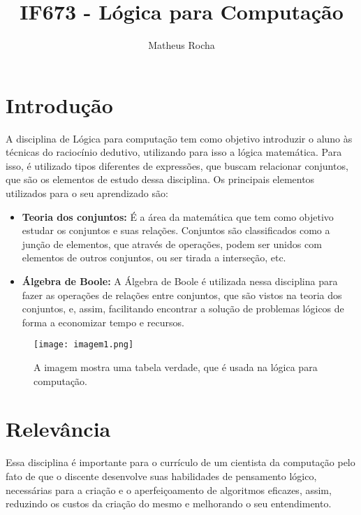 \documentclass[10pt]{article}
\title{IF673 - Lógica para Computação}
\author{Matheus Rocha}
\date{\vspace{-5ex}}
\begin{document}
\maketitle

\section{Introdução}
A disciplina de Lógica para computação tem como objetivo introduzir o aluno às técnicas do raciocínio dedutivo, utilizando para isso a lógica matemática. Para isso, é utilizado tipos diferentes de expressões, que buscam relacionar conjuntos, que são os elementos de estudo dessa disciplina. Os principais elementos utilizados para o seu aprendizado são: 
\begin{itemize}
    \item \textbf{Teoria dos conjuntos:} É a área da matemática que tem como objetivo estudar os conjuntos e suas relações. Conjuntos são classificados como a junção de elementos, que através de operações, podem ser unidos com elementos de outros conjuntos, ou ser tirada a interseção, etc.
    \item \textbf{Álgebra de Boole:} A Álgebra de Boole é utilizada nessa disciplina para fazer as operações de relações entre conjuntos, que são vistos na teoria dos conjuntos, e, assim, facilitando encontrar a solução de problemas lógicos de forma a economizar tempo e recursos.
    \citep{site4}
\end{itemize}
\begin{figure}[h]
    \centering
    \texttt{[image: imagem1.png]}
    \caption{A imagem \citep{site1} mostra uma tabela verdade, que é usada na lógica para computação.}
    \label{fig:my_label}
\end{figure}
\section{Relevância}
Essa disciplina é importante para o currículo de um cientista da computação pelo fato de que o discente desenvolve suas habilidades de pensamento lógico, necessárias para a criação e o aperfeiçoamento de algoritmos eficazes, assim, reduzindo os custos da criação do mesmo e melhorando o seu entendimento.
\end{document}

